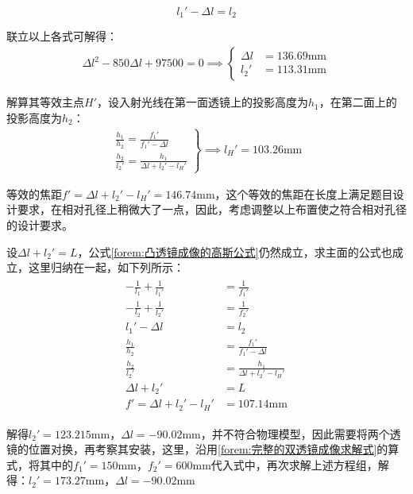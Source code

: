 \documentclass[11pt]{article}
\begin{document}
\begin{equation*}
  l_1'-\Delta l=l_2
\end{equation*}
\par
联立以上各式可解得：
\begin{align}
  \Delta l^2-850\Delta l+97500=0\implies
  \left\{
  \begin{aligned}
    \Delta l & =136.69\unit{\mm} \\
    l_2'     & =113.31\unit{\mm}
  \end{aligned}
  \right.
  \label{forem:两个透镜，照相系统}
\end{align}
\par
解算其等效主点$H'$，设入射光线在第一面透镜上的投影高度为$h_1$，在第二面上的投影高度为$h_2$：
\begin{align*}
  \left.
  \begin{aligned}
    \frac{h_1}{h_2}=\frac{f_1'}{f_1'-\Delta l} \\
    \frac{h_2}{l_2'}=\frac{h_1}{\Delta l+l_2'-l_H'}
  \end{aligned}
  \right\}\implies l_H'=103.26\unit{\mm}
\end{align*}
\par
等效的焦距$f'=\Delta l+l_2'-l_H'=146.74\unit{\mm}$，这个等效的焦距在长度上满足题目设计要求，在相对孔径上稍微大了一点，因此，考虑调整以上布置使之符合相对孔径的设计要求。\par
设$\Delta l+l_2'=L$，公式\ref{forem:凸透镜成像的高斯公式}仍然成立，求主面的公式也成立，这里归纳在一起，如下列所示：
\begin{align}
  \begin{aligned}
    -\frac{1}{l_1}+\frac{1}{l_1'} & =\frac{1}{f_1'}                 \\
    -\frac{1}{l_2}+\frac{1}{l_2'} & =\frac{1}{f_2'}                 \\
    l_1'-\Delta l                 & =l_2                            \\
    \frac{h_1}{h_2}               & =\frac{f_1'}{f_1'-\Delta l}     \\
    \frac{h_2}{l_2'}              & =\frac{h_1}{\Delta l+l_2'-l_H'} \\
    \Delta l+l_2'                 & =L                              \\
    f'=\Delta l+l_2'-l_H'         & =107.14\unit{\mm}
  \end{aligned}
  \label{forem:完整的双透镜成像求解式}
\end{align}
\par 解得$l_2'=123.215\unit{\mm}$，$\Delta l=-90.02\unit{\mm}$，并不符合物理模型，因此需要将两个透镜的位置对换，再考察其安装，这里，沿用\ref{forem:完整的双透镜成像求解式}的算式，将其中的$f_1'=150\unit{\mm}$，$f_2'=600\unit{\mm}$代入式中，再次求解上述方程组，解得：$l_2'=173.27\unit{\mm}$，$\Delta l=-90.02\unit{\mm}$
\end{document}
